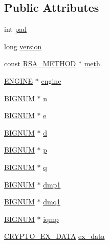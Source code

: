 \subsection*{Public Attributes}
\begin{DoxyCompactItemize}
\item 
int \hyperlink{structrsa__st_a0ad31a89c1623d6a321162b3e6ad0afd}{pad}
\item 
long \hyperlink{structrsa__st_a431bc852602846bf6893a7df86fc2cb3}{version}
\item 
const \hyperlink{ossl__typ_8h_a559f3eec8932822f887b632e86991995}{R\+S\+A\+\_\+\+M\+E\+T\+H\+OD} $\ast$ \hyperlink{structrsa__st_a9bb9437c0d3cae05cbfdca373504137d}{meth}
\item 
\hyperlink{ossl__typ_8h_abac45b251498719318e60ab8d6192510}{E\+N\+G\+I\+NE} $\ast$ \hyperlink{structrsa__st_a83c24d8df09a7832a195bfe1b4eb00df}{engine}
\item 
\hyperlink{ossl__typ_8h_a6fb19728907ec6515e4bfb716bffa141}{B\+I\+G\+N\+UM} $\ast$ \hyperlink{structrsa__st_a017d8cb5fef3f0ca9432e7616743a8c9}{n}
\item 
\hyperlink{ossl__typ_8h_a6fb19728907ec6515e4bfb716bffa141}{B\+I\+G\+N\+UM} $\ast$ \hyperlink{structrsa__st_a4681b4d0c295ea5a3f86e7b347d9e4f2}{e}
\item 
\hyperlink{ossl__typ_8h_a6fb19728907ec6515e4bfb716bffa141}{B\+I\+G\+N\+UM} $\ast$ \hyperlink{structrsa__st_ab0b7b533d5c9c40d03844bac392d05fa}{d}
\item 
\hyperlink{ossl__typ_8h_a6fb19728907ec6515e4bfb716bffa141}{B\+I\+G\+N\+UM} $\ast$ \hyperlink{structrsa__st_a1bec6526c3250e11ccce0c549f1b83cd}{p}
\item 
\hyperlink{ossl__typ_8h_a6fb19728907ec6515e4bfb716bffa141}{B\+I\+G\+N\+UM} $\ast$ \hyperlink{structrsa__st_a84e322ac5e04068ce455e1962151a260}{q}
\item 
\hyperlink{ossl__typ_8h_a6fb19728907ec6515e4bfb716bffa141}{B\+I\+G\+N\+UM} $\ast$ \hyperlink{structrsa__st_ac6f23327027071ef7399f4d72f6c01b7}{dmp1}
\item 
\hyperlink{ossl__typ_8h_a6fb19728907ec6515e4bfb716bffa141}{B\+I\+G\+N\+UM} $\ast$ \hyperlink{structrsa__st_afc6066b59b320df8632e9bdc3cce2972}{dmq1}
\item 
\hyperlink{ossl__typ_8h_a6fb19728907ec6515e4bfb716bffa141}{B\+I\+G\+N\+UM} $\ast$ \hyperlink{structrsa__st_af686fae5b080774028bc3f41370f57e6}{iqmp}
\item 
\hyperlink{ossl__typ_8h_a7eaff1c18057495d8af18f22d1370b51}{C\+R\+Y\+P\+T\+O\+\_\+\+E\+X\+\_\+\+D\+A\+TA} \hyperlink{structrsa__st_a721c63c63c45f67f572aaa177e2357ad}{ex\+\_\+data}

\end{DoxyCompactItemize}

